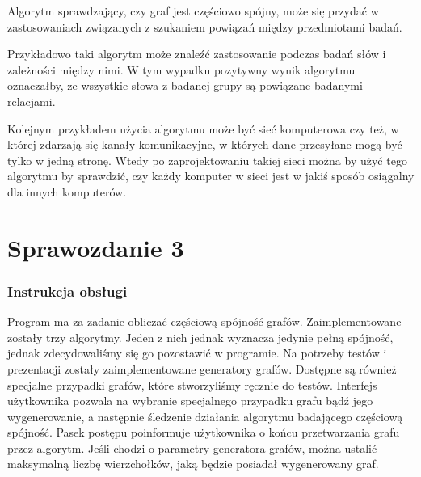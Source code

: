 \documentclass[a4paper,12pt]{mwart}
\begin{document}
Algorytm sprawdzający, czy graf jest częściowo spójny, może się przydać w
zastosowaniach związanych z szukaniem powiązań między przedmiotami badań.

Przykładowo taki algorytm może znaleźć zastosowanie podczas badań słów i
zależności między nimi. W tym wypadku pozytywny wynik algorytmu oznaczałby, ze
wszystkie słowa z badanej grupy są powiązane badanymi relacjami.

Kolejnym przykładem użycia algorytmu może być sieć komputerowa czy też, w której zdarzają się kanały
komunikacyjne, w których dane przesyłane mogą być tylko w jedną stronę. Wtedy po
zaprojektowaniu takiej sieci można by użyć tego algorytmu by sprawdzić, czy
każdy komputer w sieci jest w jakiś sposób osiągalny dla innych komputerów.

\newpage

\part{Sprawozdanie 3}

\section{Instrukcja obsługi}

Program ma za zadanie obliczać częściową spójność grafów. Zaimplementowane
zostały trzy algorytmy. Jeden z nich jednak wyznacza jedynie pełną spójność,
jednak zdecydowaliśmy się go pozostawić w programie. Na potrzeby testów i
prezentacji zostały zaimplementowane generatory grafów. Dostępne są również
specjalne przypadki grafów, które stworzyliśmy ręcznie do testów. Interfejs
użytkownika pozwala na wybranie specjalnego przypadku grafu bądź jego
wygenerowanie, a
następnie śledzenie działania algorytmu badającego częściową spójność. Pasek
postępu poinformuje użytkownika o końcu przetwarzania grafu przez algorytm.
Jeśli chodzi o parametry generatora grafów, można ustalić maksymalną liczbę
wierzchołków, jaką będzie posiadał wygenerowany graf.
\end{document}
